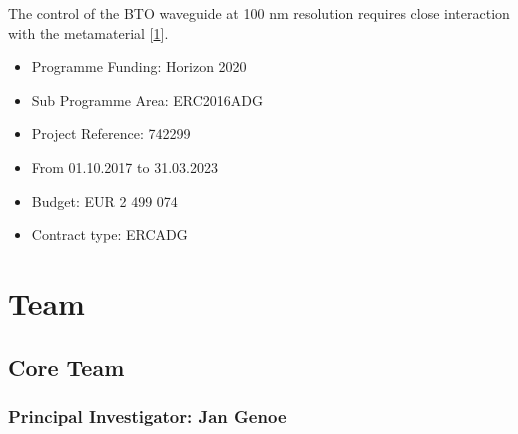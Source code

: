 \documentclass[a4paper,10pt,english,openany,oneside]{jupyterBook}
\begin{document}
\begin{DUlineblock}{0em}
\item[] 
\end{DUlineblock}

\begin{DUlineblock}{0em}
\item[] 
\end{DUlineblock}

\sphinxAtStartPar
The control of the BTO waveguide at 100 nm resolution requires close interaction with the metamaterial {[}\hyperlink{cite.bib:id4}{1}{]}.

\begin{DUlineblock}{0em}
\item[] 
\end{DUlineblock}
\begin{itemize}
\item {} 
\sphinxAtStartPar
Programme Funding: Horizon 2020

\item {} 
\sphinxAtStartPar
Sub Programme Area: ERC\sphinxhyphen{}2016\sphinxhyphen{}ADG

\item {} 
\sphinxAtStartPar
Project Reference: 742299

\item {} 
\sphinxAtStartPar
From 01.10.2017 to 31.03.2023

\item {} 
\sphinxAtStartPar
Budget: EUR 2 499 074

\item {} 
\sphinxAtStartPar
Contract type: ERC\sphinxhyphen{}ADG

\end{itemize}

\sphinxstepscope


\chapter{Team}
\label{\detokenize{Team:team}}\label{\detokenize{Team::doc}}

\section{Core Team}
\label{\detokenize{Team:core-team}}

\subsection{Principal Investigator: Jan Genoe}
\label{\detokenize{Team:principal-investigator-jan-genoe}}
\end{document}
